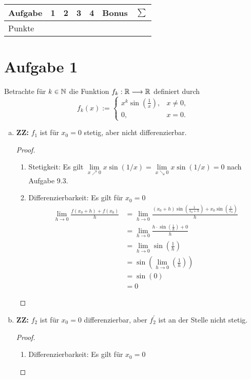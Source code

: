 \documentclass{article}
\begin{document}
		\begin{tabular}{l|c|r|l|c|r|l}\hline\hline
		Aufgabe &  1 & 2 & 3 &4 & Bonus&$\sum$ \\
		\hline 
		Punkte &  & & & &  &\\
		\cline{2-2}
		\hline \end{tabular}
	\section*{Aufgabe 1}
		Betrachte für $k \in \mathbb{N}$ die Funktion $f_k: \mathbb{R} \longrightarrow \mathbb{R}$ definiert durch
		$$f_{k}(x):= \begin{cases} 
							x^k\operatorname{sin}(\frac{1}{x}), & x \neq 0,\\
							0, & x=0.
							\end{cases}
							$$
		\begin{enumerate}[(a)]
			\item 
				\textbf{ZZ:}  $f_1$ ist für $x_0=0$ stetig, aber nicht differenzierbar.
				\begin{proof}
					\begin{enumerate}[1.] 
						\item Stetigkeit:  Es gilt $\lim\limits_{x \nearrow 0}x\operatorname{sin}(1/x) = \lim\limits_{x \searrow 0}x \operatorname{sin}(1/x) = 0$ nach Aufgabe 9.3.
						\item Differenzierbarkeit: Es gilt für $x_0=0$ 
						\begin{align*}
							\lim\limits_{h \rightarrow 0}\frac{f(x_0+h)+f(x_0)}{h} &= \lim\limits_{h \rightarrow 0}\frac{(x_0+h)\sin(\frac{1}{x_0+h})+x_0\sin(\frac{1}{x_0})}{h}\\ &= \lim\limits_{h \rightarrow 0}\frac{h\cdot\sin(\frac{1}{h})+0}{h}\\
						&=\lim\limits_{h \rightarrow 0}\sin\left(\frac{1}{h}\right)\\ &=\sin\left(\lim\limits_{h \rightarrow 0}\left(\frac{1}{h}\right)\right)\\ &= \sin(0)\\ &= 0
						\end{align*}
					\end{enumerate}
				\end{proof}
			\item \textbf{ZZ:} $f_2$ ist für $x_0=0$ differenzierbar, aber $f_{2}^{'}$ ist an der Stelle nicht stetig.
			\begin{proof}
				\begin{enumerate}[1.]
					\item Differenzierbarkeit: Es gilt für $x_0=0$

\end{enumerate}
\end{proof}
\end{enumerate}
\end{document}
